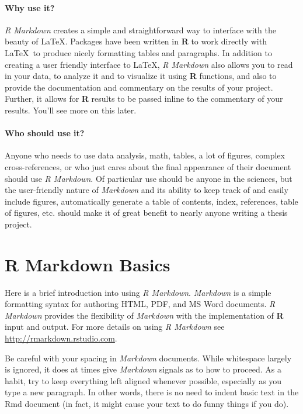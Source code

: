 \documentclass[12pt,twoside]{reedthesis}
\begin{document}
  \subsubsection{Why use it?}\label{why-use-it}
  
  \emph{R Markdown} creates a simple and straightforward way to interface
  with the beauty of \LaTeX. Packages have been written in \textbf{R} to
  work directly with \LaTeX~to produce nicely formatting tables and
  paragraphs. In addition to creating a user friendly interface to \LaTeX,
  \emph{R Markdown} also allows you to read in your data, to analyze it
  and to visualize it using \textbf{R} functions, and also to provide the
  documentation and commentary on the results of your project. Further, it
  allows for \textbf{R} results to be passed inline to the commentary of
  your results. You'll see more on this later.
  
  \subsubsection{Who should use it?}\label{who-should-use-it}
  
  Anyone who needs to use data analysis, math, tables, a lot of figures,
  complex cross-references, or who just cares about the final appearance
  of their document should use \emph{R Markdown}. Of particular use should
  be anyone in the sciences, but the user-friendly nature of
  \emph{Markdown} and its ability to keep track of and easily include
  figures, automatically generate a table of contents, index, references,
  table of figures, etc. should make it of great benefit to nearly anyone
  writing a thesis project.
  
  \hypertarget{rmd-basics}{\chapter{R Markdown Basics}\label{rmd-basics}}
  
  Here is a brief introduction into using \emph{R Markdown}.
  \emph{Markdown} is a simple formatting syntax for authoring HTML, PDF,
  and MS Word documents. \emph{R Markdown} provides the flexibility of
  \emph{Markdown} with the implementation of \textbf{R} input and output.
  For more details on using \emph{R Markdown} see
  \url{http://rmarkdown.rstudio.com}.
  
  Be careful with your spacing in \emph{Markdown} documents. While
  whitespace largely is ignored, it does at times give \emph{Markdown}
  signals as to how to proceed. As a habit, try to keep everything left
  aligned whenever possible, especially as you type a new paragraph. In
  other words, there is no need to indent basic text in the Rmd document
  (in fact, it might cause your text to do funny things if you do).
  
\end{document}
